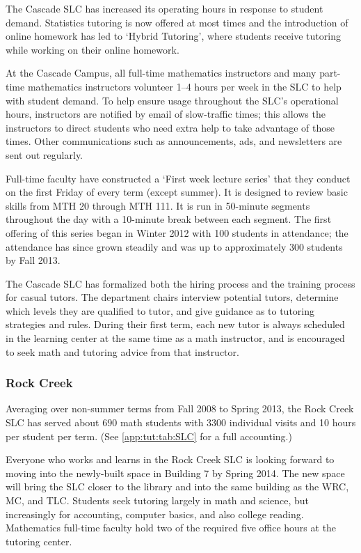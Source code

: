 The Cascade SLC has increased its operating hours in response to student demand.
Statistics tutoring is now offered at most times and the introduction of online homework has led to `Hybrid Tutoring', where students receive tutoring while working on their online homework.

At the Cascade Campus, all full-time mathematics instructors and many part-time mathematics instructors volunteer 1--4 hours per week in the SLC to help with student demand.
To help ensure usage throughout the SLC's operational hours, instructors are notified by email of slow-traffic times; this allows the instructors to direct students who need extra help to take advantage of those times.
Other communications such as announcements, ads, and newsletters are sent out regularly.

Full-time faculty have constructed a `First week lecture series' that they conduct on the first Friday of every term (except summer).
It is designed to review basic skills from MTH 20 through MTH 111.
It is run in 50-minute segments throughout the day with a 10-minute break between each segment.
The first offering of this series began in Winter 2012 with 100 students in attendance; the attendance has since  grown steadily and  was up to approximately 300 students by Fall 2013.

The Cascade SLC has formalized both the hiring process and the training process for casual tutors.
The department chairs interview potential tutors, determine which levels they are qualified to tutor, and give guidance as to tutoring strategies and rules.
During their first term, each new tutor is always scheduled in the learning center at the same time as a math instructor, and is encouraged to seek math and tutoring advice from that instructor.

\subsubsection{Rock Creek}
Averaging over non-summer terms from Fall 2008 to Spring 2013, the Rock Creek SLC has served about 690 math students with 3300 individual visits and 10 hours per student per term.
(See \vref{app:tut:tab:SLC} for a full accounting.)

Everyone who works and learns in the Rock Creek SLC is looking forward to moving into the newly-built space in Building 7 by Spring 2014.
The new space will bring the SLC closer to the library and into the same building as the WRC, MC, and TLC.
Students seek tutoring largely in math and science, but increasingly for accounting, computer basics, and also college reading.
Mathematics full-time faculty hold two of the required five office hours at the tutoring center.

